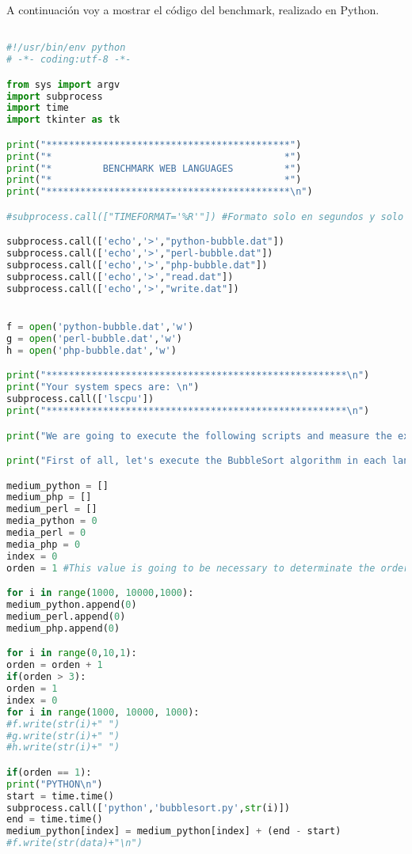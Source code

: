A continuación voy a mostrar el código del benchmark, realizado en Python.\\
\begin{lstlisting}[language=python]

#!/usr/bin/env python
# -*- coding:utf-8 -*-

from sys import argv
import subprocess
import time
import tkinter as tk

print("*******************************************")
print("*                                         *")
print("*         BENCHMARK WEB LANGUAGES         *")
print("*                                         *")
print("*******************************************\n")

#subprocess.call(["TIMEFORMAT='%R'"]) #Formato solo en segundos y solo el real time

subprocess.call(['echo','>',"python-bubble.dat"])
subprocess.call(['echo','>',"perl-bubble.dat"])
subprocess.call(['echo','>',"php-bubble.dat"])
subprocess.call(['echo','>',"read.dat"])
subprocess.call(['echo','>',"write.dat"])


f = open('python-bubble.dat','w')
g = open('perl-bubble.dat','w')
h = open('php-bubble.dat','w')

print("*****************************************************\n")
print("Your system specs are: \n")
subprocess.call(['lscpu'])
print("*****************************************************\n")

print("We are going to execute the following scripts and measure the execution time.\n")

print("First of all, let's execute the BubbleSort algorithm in each language.\n")

medium_python = []
medium_php = []
medium_perl = []
media_python = 0
media_perl = 0
media_php = 0
index = 0
orden = 1 #This value is going to be necessary to determinate the order of scripts execution

for i in range(1000, 10000,1000):
medium_python.append(0)
medium_perl.append(0)
medium_php.append(0)

for i in range(0,10,1):
orden = orden + 1
if(orden > 3):
orden = 1
index = 0
for i in range(1000, 10000, 1000):
#f.write(str(i)+" ")
#g.write(str(i)+" ")
#h.write(str(i)+" ")

if(orden == 1):
print("PYTHON\n")
start = time.time()
subprocess.call(['python','bubblesort.py',str(i)])
end = time.time()
medium_python[index] = medium_python[index] + (end - start)
#f.write(str(data)+"\n")


\end{lstlisting}
